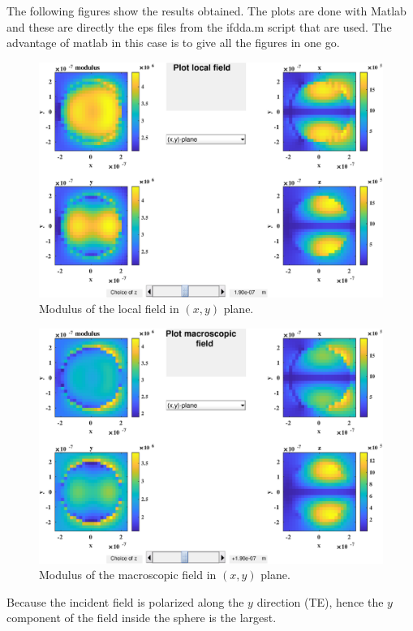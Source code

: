 The following figures show the results obtained. The plots are done
with Matlab and these are directly the eps files from the ifdda.m
script that are used. The advantage of matlab in this case is to give
all the figures in one go.
\begin{figure}[H]
\begin{center}
  \includegraphics*[width=15.0cm,draft=false]{test1local.eps}
\end{center}
\caption{Modulus of the local field in $(x,y)$ plane.}
\end{figure}
\begin{figure}[H]
\begin{center}
  \includegraphics*[width=15.0cm,draft=false]{test1macro.eps}
\end{center}
\caption{Modulus of the macroscopic field in $(x,y)$ plane.}
\end{figure}
Because the incident field is polarized along the $y$ direction (TE),
hence the $y$ component of the field inside the sphere is the largest.

